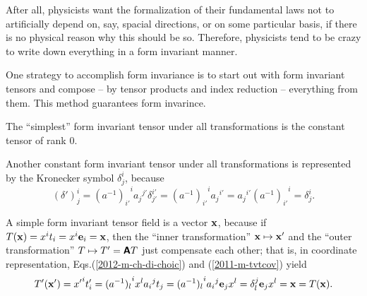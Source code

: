 After all, physicists want the formalization of their fundamental laws not to artificially depend on,
say, spacial directions, or on some particular basis, if there is no physical reason why this should be so.
Therefore, physicists tend to be crazy to write down everything in a
form invariant manner.

One strategy to accomplish  form invariance  is to start out with form invariant
tensors and compose -- by tensor products and index reduction -- everything from them. This method guarantees form
invarince.

{
\color{blue}
\bexample

The ``simplest'' form invariant tensor under all transformations is the constant tensor of rank $0$.

Another constant form invariant tensor  under all transformations is represented by the Kronecker symbol $\delta^i_j$,
because
\begin{equation}
{(\delta ')}^i_j= {(a^{-1})_{i'}}^i {a_j}^{j'}\delta^{i'}_{j'}={(a^{-1})_{i'}}^i {a_j}^{i'}= {a_j}^{i'}{(a^{-1})_{i'}}^i=\delta^i_j
.
\end{equation}

A simple form invariant tensor field is a vector ${\bf x}$,
because if $T({\bf x})= x^i t_i= x^i {\bf e}_i={\bf x}$, then
the ``inner transformation''
${\bf x} \mapsto  {\bf x}'$
and the ``outer transformation''
$T \mapsto  T'= \textsf{\textbf{A}}T$
just compensate each other; that is, in coordinate representation, Eqs.(\ref{2012-m-ch-di-choic}) and (\ref{2011-m-tvtcov}) yield
\begin{equation}
T'({\bf x}')= {x'}^i t'_i= {(a^{-1})_l}^i x^l   {a_i}^j t_j = {(a^{-1})_l}^i  {a_i}^j {\bf e}_j  x^l
= \delta_l^j {\bf e}_j  x^l = {\bf x} = T({\bf x}).
\end{equation}



}
